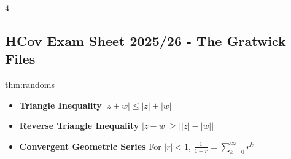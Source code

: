 \documentclass[landscape, 8pt]{extarticle}
\begin{document}
	\fontsize{5pt}{6pt} \selectfont

	\setlength\tabcolsep{4.5pt}
	\setlength\extrarowheight{2pt}

	
	\setlength{\abovedisplayskip}{0pt}
	\setlength{\belowdisplayskip}{0pt}
	\setlength{\abovedisplayshortskip}{0pt}
	\setlength{\belowdisplayshortskip}{0pt}
	
	\begin{multicols*}{4}
		\raggedcolumns 
		\vspace{-5pt}
		\subsection*{HCov Exam Sheet 2025/26 - The Gratwick Files}
		\vspace{-5pt}
		\begin{thm}{thm:randoms}{ }
			\begin{itemize}
				\item \textbf{Triangle Inequality} $\left|z + w\right| \le \left|z\right| + \left|w\right|$
				\item \textbf{Reverse Triangle Inequality} $\left| z - w\right| \ge \left|\left|z\right| - \left|w\right|\right|$
				\item \textbf{Convergent Geometric Series} For $\left|r\right| < 1$, $\frac{1}{1-r} = \sum_{k=0}^{\infty}r^k$
			\end{itemize}
		\end{thm}
		

\end{multicols*}
\end{document}
